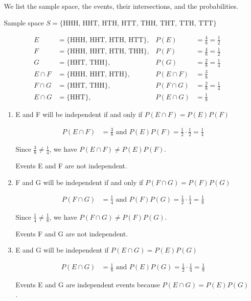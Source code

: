 \begin{solution}
    We list the sample space, the events, their intersections, and the probabilities.

    Sample space \( S = \{\text{HHH, HHT, HTH, HTT, THH, THT, TTH, TTT}\} \)

    \begin{align*}
        E        & = \{\text{HHH, HHT, HTH, HTT}\}, & P(E)        & = \frac{4}{8} = \frac{1}{2} \\
        F        & = \{\text{HHH, HHT, HTH, THH}\}, & P(F)        & = \frac{4}{8} = \frac{1}{2} \\
        G        & = \{\text{HHT, THH}\},           & P(G)        & = \frac{2}{8} = \frac{1}{4} \\
        E \cap F & = \{\text{HHH, HHT, HTH}\},      & P(E \cap F) & = \frac{3}{8}               \\
        F \cap G & = \{\text{HHT, THH}\},           & P(F \cap G) & = \frac{2}{8} = \frac{1}{4} \\
        E \cap G & = \{\text{HHT}\},                & P(E \cap G) & = \frac{1}{8}
    \end{align*}

    \begin{enumerate}
        \item  E and F will be independent if and only if \( P(E \cap F) = P(E)P(F) \)

              \begin{align*}
                  P(E \cap F) & = \frac{3}{8} \text{ and } P(E)P(F) = \frac{1}{2} \cdot \frac{1}{2} = \frac{1}{4}
              \end{align*}

              Since \( \frac{3}{8} \neq \frac{1}{4} \), we have \( P(E \cap F) \neq P(E)P(F) \).

              Events E and F are not independent.
        \item  F and G will be independent if and only if \( P(F \cap G) = P(F)P(G) \)

              \begin{align*}
                  P(F \cap G) & = \frac{1}{4} \text{ and } P(F)P(G) = \frac{1}{2} \cdot \frac{1}{4} = \frac{1}{8}
              \end{align*}

              Since \( \frac{1}{4} \neq \frac{1}{8} \), we have \( P(F \cap G) \neq P(F)P(G) \).

              Events F and G are not independent.
        \item E and G will be independent if \( P(E \cap G) = P(E)P(G) \)

              \begin{align*}
                  P(E \cap G) & = \frac{1}{8} \text{ and } P(E)P(G) = \frac{1}{2} \cdot \frac{1}{4} = \frac{1}{8}
              \end{align*}

              Events E and G are independent events because \( P(E \cap G) = P(E)P(G) \).
    \end{enumerate}
\end{solution}

